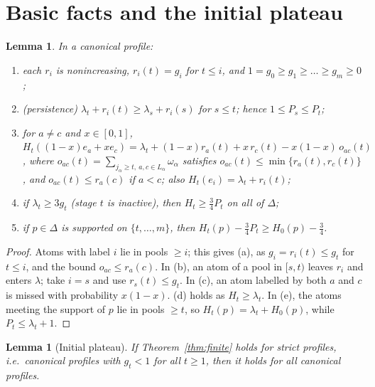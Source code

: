 \documentclass[11pt,a4paper]{article}
\numberwithin{equation}{section}
\newtheorem{lemma}[theorem]{Lemma}
\theoremstyle{definition}
\newcommand{\tq}{\tfrac34}
\begin{document}
\section{Basic facts and the initial plateau}\label{sec:basic}

\begin{lemma}\label{lem:facts}In a canonical profile:
\begin{enumerate}[label=(\alph*)]
\item each $r_i$ is nonincreasing, $r_i(t)=g_i$ for $t\le i$, and
$1=g_0\ge g_1\ge\dots\ge g_m\ge0$;
\item (persistence) $\lambda_t+r_i(t)\ge\lambda_s+r_i(s)$ for $s\le t$; hence
$1\le P_s\le P_t$;
\item for $a\ne c$ and $x\in[0,1]$,
$H_t((1-x)e_a+xe_c)=\lambda_t+(1-x)r_a(t)+x\,r_c(t)-x(1-x)\,o_{ac}(t)$, where
$o_{ac}(t)=\sum_{j_\alpha\ge t,\ a,c\in L_\alpha}\omega_\alpha$ satisfies
$o_{ac}(t)\le\min\{r_a(t),r_c(t)\}$, and $o_{ac}(t)\le r_a(c)$ if $a<c$;
also $H_t(e_i)=\lambda_t+r_i(t)$;
\item if $\lambda_t\ge3g_t$ (stage $t$ is \emph{inactive}), then $H_t\ge\tq P_t$
on all of $\Delta$;
\item if $p\in\Delta$ is supported on $\{t,\dots,m\}$, then
$H_t(p)-\tq P_t\ge H_0(p)-\tq$.
\end{enumerate}
\end{lemma}

\begin{proof}
Atoms with label $i$ lie in pools $\ge i$; this gives (a), as
$g_i=r_i(t)\le g_t$ for $t\le i$, and the bound $o_{ac}\le r_a(c)$. In (b), an
atom of a pool in $[s,t)$ leaves $r_i$ and enters $\lambda$; take $i=s$ and use
$r_s(t)\le g_t$. In (c), an atom labelled by both $a$ and $c$ is missed with
probability $x(1-x)$. (d) holds as $H_t\ge\lambda_t$. In (e), the atoms meeting
the support of $p$ lie in pools $\ge t$, so $H_t(p)=\lambda_t+H_0(p)$, while
$P_t\le\lambda_t+1$.
\end{proof}

\begin{lemma}[Initial plateau]\label{lem:plateau}If Theorem~\ref{thm:finite} holds for \emph{strict} profiles, i.e.\ canonical
profiles with $g_t<1$ for all $t\ge1$, then it holds for all canonical
profiles.
\end{lemma}
\end{document}
